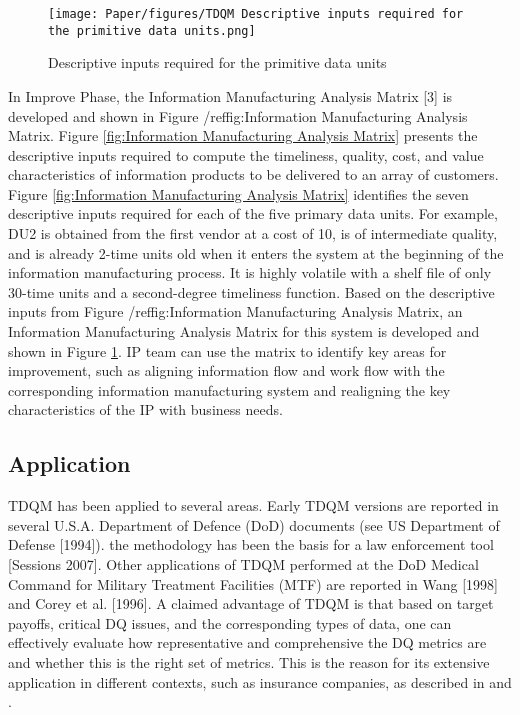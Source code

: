\documentclass[pdftex,english,oribibl]{llncs}
\begin{document}
\begin{figure}
    \centering
    \texttt{[image: Paper/figures/TDQM Descriptive inputs required for the primitive data units.png]}
    \caption{Descriptive inputs required for the primitive data units}
    \label{fig:Descriptive inputs required for the primitive data units}
 \end{figure}

In Improve Phase, the Information Manufacturing Analysis Matrix [3] is developed and shown in Figure /ref{fig:Information Manufacturing Analysis Matrix}. Figure \ref{fig:Information Manufacturing Analysis Matrix} presents the descriptive inputs required to compute the timeliness, quality, cost, and value characteristics of information products to be delivered to an array of customers. Figure \ref{fig:Information Manufacturing Analysis Matrix} identifies the seven descriptive inputs required for each of the five primary data units. For example, DU2 is obtained from the first vendor at a cost of 10, is of intermediate quality, and is already 2-time units old when it enters the system at the beginning of the information manufacturing process. It is highly volatile with a shelf file of only 30-time units and a second-degree timeliness function. Based on the descriptive inputs from Figure /ref{fig:Information Manufacturing Analysis Matrix}, an Information Manufacturing Analysis Matrix for this system is developed and shown in Figure \ref{fig:Descriptive inputs required for the primitive data units}.
 IP team can use the matrix to identify key areas for improvement, such as aligning information flow and work flow with the corresponding information manufacturing system and realigning the key characteristics of the IP with business needs.

\subsection{Application}
TDQM has been applied to several areas. Early TDQM versions are reported in several U.S.A. Department of Defence (DoD) documents (see US Department of Defense [1994]). the methodology has been the basis for a law enforcement tool [Sessions 2007]. Other applications of TDQM performed at the DoD Medical Command for Military Treatment Facilities (MTF) are reported in Wang [1998] and Corey et al. [1996]. A claimed advantage of TDQM is that based on target payoffs, critical DQ issues, and the corresponding types of data, one can effectively evaluate how representative and comprehensive the DQ metrics are and whether this is the right set of metrics. This is the reason for its extensive application in different contexts, such as insurance companies, as described in \cite{Nadkarni2006} and  \cite{Patrick2005}.
\end{document}
